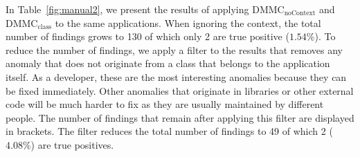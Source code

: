 \begin{table}[t]
    \centering
    \caption{Comparison of $\text{DMMC}_\text{noContext}$ and $\text{DMMC}_\text{class}$. The numbers in brackets indicate findings on the project itself.}\label{fig:manual2}
\end{table}

In Table~\ref{fig:manual2}, we present the results of applying $\text{DMMC}_\text{noContext}$ and $\text{DMMC}_\text{class}$ to the same applications.
When ignoring the context, the total number of findings grows to 130 of which only 2 are true positive ($1.54\%$).
To reduce the number of findings, we apply a filter to the results that removes any anomaly that does not originate from a class that belongs to the application itself.
As a developer, these are the most interesting anomalies because they can be fixed immediately.
Other anomalies that originate in libraries or other external code will be much harder to fix as they are usually maintained by different people.
The number of findings that remain after applying this filter are displayed in brackets.
The filter reduces the total number of findings to 49 of which 2 ($4.08\%$) are true positives.

